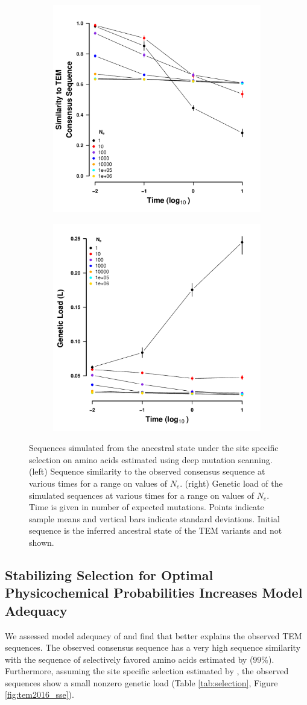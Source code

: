 \documentclass[12pt]{article}
\begin{document}
\begin{figure}[h]
    \centering
    \begin{subfigure}
        \centering
        \includegraphics[width=.45\textwidth]{img/simulated_dist_time_DMS_ancest.pdf}
    \end{subfigure}
    \begin{subfigure}
        \centering
        \includegraphics[width=.45\textwidth]{img/simulated_gl_time_DMS_ancest.pdf}
    \end{subfigure}
    \caption{Sequences simulated from the ancestral state under the site specific selection on amino acids estimated using deep mutation scanning. 
    (left) Sequence similarity to the observed consensus sequence at various times for a range on values of $N_e$.
    (right) Genetic load of the simulated sequences at various times for a range on values of $N_e$.
    Time is given in number of expected mutations.
    Points indicate sample means and vertical bars indicate standard deviations. Initial sequence is the inferred ancestral state of the TEM variants and not shown.}
    \label{fig:dms_sim}
\end{figure}

\subsection*{Stabilizing Selection for Optimal Physicochemical Probabilities Increases Model Adequacy} 
We assessed model adequacy of \selac and find that \selac better explains the observed TEM sequences.
The observed consensus sequence has a very high sequence similarity with the sequence of selectively favored amino acids estimated by \selac ($99 \%$).
Furthermore, assuming the site specific selection estimated by \selac, the observed sequences show a small nonzero genetic load (Table \ref{tab:selection}, Figure \ref{fig:tem2016_sse}).
\end{document}
